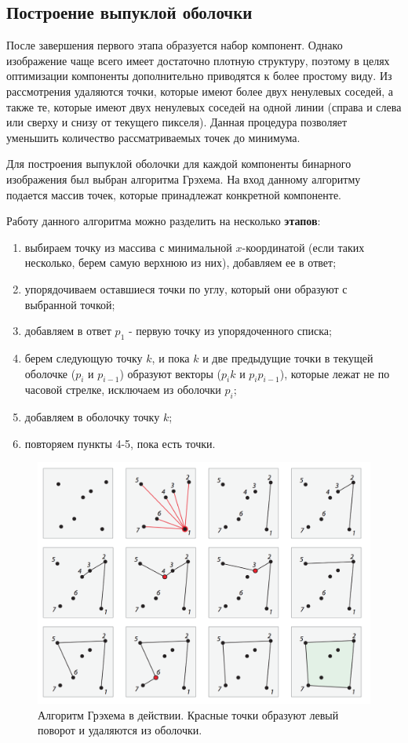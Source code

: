 \documentclass[a4paper, 12pt]{extarticle}
\newcommand{\n}{\par}
\begin{document}
	\subsection{Построение выпуклой оболочки}
	После завершения первого этапа образуется набор компонент. Однако изображение чаще всего имеет достаточно плотную структуру, поэтому в целях оптимизации компоненты дополнительно приводятся к более простому виду. Из рассмотрения удаляются точки, которые имеют более двух ненулевых соседей, а также те, которые имеют двух ненулевых соседей на одной линии (справа и слева или сверху и снизу от текущего пикселя). Данная процедура позволяет уменьшить количество рассматриваемых точек до минимума.\n
	Для построения выпуклой оболочки для каждой компоненты бинарного изображения был выбран алгоритма Грэхема. На вход данному алгоритму подается массив точек, которые принадлежат конкретной компоненте.\n
	Работу данного алгоритма можно разделить на несколько \textbf{этапов}:
	\begin{enumerate}
		\item выбираем точку из массива с минимальной $x$-координатой (если таких несколько, берем самую верхнюю из них), добавляем ее в ответ;
		\item упорядочиваем оставшиеся точки по углу, который они образуют с выбранной точкой;
		\item добавляем в ответ $p_1$ - первую точку из упорядоченного списка;
		\item берем следующую точку $k$, и пока $k$ и две предыдущие точки в текущей оболочке ($p_i$ и $p_{i−1}$) образуют векторы ($p_i$$k$ и $p_i$$p_{i−1}$), которые лежат не по часовой стрелке, исключаем из оболочки $p_i$;
		\item добавляем в оболочку точку $k$;
		\item повторяем пункты 4-5, пока есть точки.
	\end{enumerate}
	\begin{figure}[H]
		\centering
		\includegraphics[width=\linewidth]{img/graham}
		\caption{Алгоритм Грэхема в действии. Красные точки образуют левый поворот и удаляются из оболочки.}
		\label{fig:graham}
	\end{figure}
	\newpage
\end{document}
